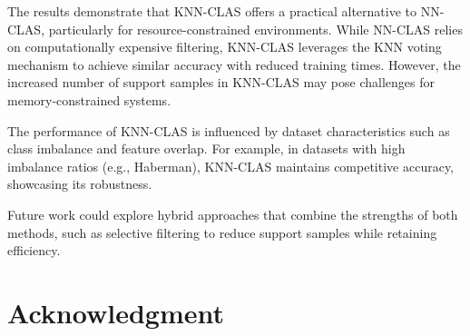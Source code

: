\documentclass[conference]{IEEEtran}
\begin{document}
The results demonstrate that KNN-CLAS offers a practical alternative to NN-CLAS, particularly for resource-constrained environments. While NN-CLAS relies on computationally expensive filtering, KNN-CLAS leverages the KNN voting mechanism to achieve similar accuracy with reduced training times. However, the increased number of support samples in KNN-CLAS may pose challenges for memory-constrained systems.

The performance of KNN-CLAS is influenced by dataset characteristics such as class imbalance and feature overlap. For example, in datasets with high imbalance ratios (e.g., Haberman), KNN-CLAS maintains competitive accuracy, showcasing its robustness.

Future work could explore hybrid approaches that combine the strengths of both methods, such as selective filtering to reduce support samples while retaining efficiency.

\section*{Acknowledgment}
\end{document}
